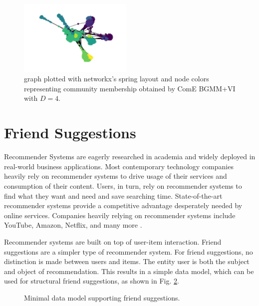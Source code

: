 \documentclass[conference]{IEEEtran}
\begin{document}
\begin{figure}
    \centering
    \includegraphics[width=0.48\textwidth]{images/fb/graph_d4.png}
    \caption{ graph plotted with networkx's spring layout and node colors representing community membership obtained by ComE BGMM+VI with $D=4$.\cite{networkx}}
    \label{fig:fb_graph}
\end{figure}


\section{Friend Suggestions}

Recommender Systems are eagerly researched in academia and widely deployed in real-world business applications. Most contemporary technology companies heavily rely on recommender systems to drive usage of their services and consumption of their content. Users, in turn, rely on recommender systems to find what they want and need and save searching time. State-of-the-art recommender systems provide a competitive advantage desperately needed by online services. Companies heavily relying on recommender systems include YouTube, Amazon, Netflix, and many more \cite{Rocca19}.

Recommender systems are built on top of user-item interaction. Friend suggestions are a simpler type of recommender system. For friend suggestions, no distinction is made between users and items. The entity user is both the subject and object of recommendation. This results in a simple data model, which can be used for structural friend suggestions, as shown in Fig. \ref{fig:data_model}.

\begin{figure}[h]
    \centering
    \caption{Minimal data model supporting friend suggestions.}
    \label{fig:data_model}
\end{figure}
\end{document}
